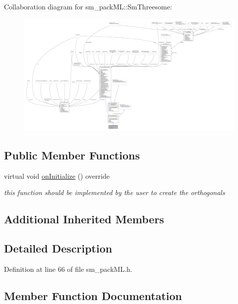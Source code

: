 Collaboration diagram for sm\+\_\+pack\+ML\+:\+:Sm\+Threesome\+:
\nopagebreak
\begin{figure}[H]
\begin{center}
\leavevmode
\includegraphics[width=350pt]{structsm__packML_1_1SmThreesome__coll__graph}
\end{center}
\end{figure}
\subsection*{Public Member Functions}
\begin{DoxyCompactItemize}
\item 
virtual void \hyperlink{structsm__packML_1_1SmThreesome_a020aacf16204e92a6aeecc81ee2016cb}{on\+Initialize} () override
\begin{DoxyCompactList}\small\item\em this function should be implemented by the user to create the orthogonals \end{DoxyCompactList}\end{DoxyCompactItemize}
\subsection*{Additional Inherited Members}


\subsection{Detailed Description}


Definition at line 66 of file sm\+\_\+pack\+M\+L.\+h.



\subsection{Member Function Documentation}
